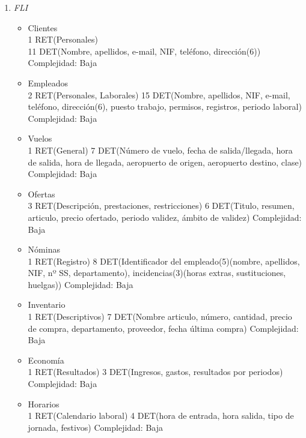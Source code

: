 		\begin{enumerate}
			\item \textit{FLI}
			\begin{itemize}
				\item Clientes \\
					1 RET(Personales) \\
					11 DET(Nombre, apellidos, e-mail, NIF, teléfono, dirección(6)) \\
					Complejidad: Baja\\
				\item Empleados \\
					2 RET(Personales, Laborales)
					15 DET(Nombre, apellidos, NIF, e-mail, teléfono, dirección(6), puesto trabajo, permisos, registros, periodo laboral)
					Complejidad: Baja\\
				\item Vuelos\\
					1 RET(General)
					7 DET(Número de vuelo, fecha de salida/llegada, hora de salida, hora de llegada, aeropuerto de origen, aeropuerto destino,
					clase)
					Complejidad: Baja\\
				\item Ofertas\\
					3 RET(Descripción, prestaciones, restricciones)
					6 DET(Titulo, resumen, articulo, precio ofertado, periodo validez, ámbito de validez)
					Complejidad: Baja\\
				\item Nóminas\\
					1 RET(Registro)
					8 DET(Identificador del empleado(5)(nombre, apellidos, NIF, nº SS, departamento), incidencias(3)(horas extras,
					sustituciones, huelgas))
					Complejidad: Baja\\
				\item Inventario\\
					1 RET(Descriptivos)
					7 DET(Nombre articulo, número, cantidad, precio de compra, departamento, proveedor, fecha última compra)
					Complejidad: Baja\\
				\item Economía\\
					1 RET(Resultados)
					3 DET(Ingresos, gastos, resultados por periodos)
					Complejidad: Baja\\
				\item Horarios\\
					1 RET(Calendario laboral)
					4 DET(hora de entrada, hora salida, tipo de jornada, festivos)
					Complejidad: Baja\\

\end{itemize}
\end{enumerate}
